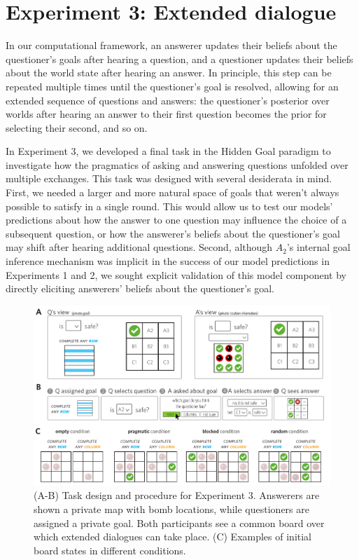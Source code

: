 \documentclass[12pt, floatsintext, jou]{apa6}
\begin{document}
\section{Experiment 3: Extended dialogue}

In our computational framework, an answerer updates their beliefs about the questioner's goals after hearing a question, and a questioner updates their beliefs about the world state after hearing an answer. 
In principle, this step can be repeated multiple times until the questioner's goal is resolved, allowing for an extended sequence of questions and answers: the questioner's posterior over worlds after hearing an answer to their first question becomes the prior for selecting their second, and so on.

In Experiment 3, we developed a final task in the Hidden Goal paradigm to investigate how the pragmatics of asking and answering questions unfolded over multiple exchanges.
This task was designed with several desiderata in mind.
First, we needed a larger and more natural space of goals that weren't always possible to satisfy in a single round.
This would allow us to test our models' predictions about how the answer to one question may influence the choice of a subsequent question, or how the answerer's beliefs about the questioner's goal may shift after hearing additional questions.
Second, although $A_2$'s internal goal inference mechanism was implicit in the success of our model predictions in Experiments 1 and 2, we sought explicit validation of this model component by directly eliciting answerers' beliefs about the questioner's goal.

\begin{figure}[tbh!]
\begin{center}
\includegraphics[scale = .7]{Exp3/spatialDemo.pdf}
\end{center}
\caption{(A-B) Task design and procedure for Experiment 3. Answerers are shown a private map with bomb locations, while questioners are assigned a private goal. Both participants see a common board over which extended dialogues can take place. (C) Examples of initial board states in different conditions.}
\label{fig:exp3task}
\end{figure}
\end{document}

